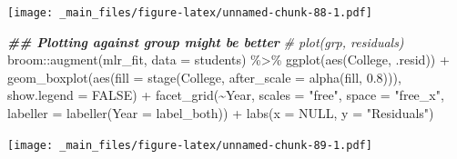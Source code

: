 \documentclass[
]{book}
\newenvironment{Shaded}{\begin{snugshade}}{\end{snugshade}}
\newcommand{\AttributeTok}[1]{\textcolor[rgb]{0.77,0.63,0.00}{#1}}
\newcommand{\CommentTok}[1]{\textcolor[rgb]{0.56,0.35,0.01}{\textit{#1}}}
\newcommand{\ConstantTok}[1]{\textcolor[rgb]{0.00,0.00,0.00}{#1}}
\newcommand{\DocumentationTok}[1]{\textcolor[rgb]{0.56,0.35,0.01}{\textbf{\textit{#1}}}}
\newcommand{\FloatTok}[1]{\textcolor[rgb]{0.00,0.00,0.81}{#1}}
\newcommand{\FunctionTok}[1]{\textcolor[rgb]{0.00,0.00,0.00}{#1}}
\newcommand{\NormalTok}[1]{#1}
\newcommand{\SpecialCharTok}[1]{\textcolor[rgb]{0.00,0.00,0.00}{#1}}
\newcommand{\StringTok}[1]{\textcolor[rgb]{0.31,0.60,0.02}{#1}}
\begin{document}
\texttt{[image: \_main\_files/figure-latex/unnamed-chunk-88-1.pdf]}

\begin{Shaded}
\begin{Highlighting}[]
\DocumentationTok{\#\# Plotting against group might be better}
\CommentTok{\# plot(grp, residuals)}
\NormalTok{broom}\SpecialCharTok{::}\FunctionTok{augment}\NormalTok{(mlr\_fit, }\AttributeTok{data =}\NormalTok{ students) }\SpecialCharTok{\%\textgreater{}\%} 
  \FunctionTok{ggplot}\NormalTok{(}\FunctionTok{aes}\NormalTok{(College, .resid)) }\SpecialCharTok{+}
  \FunctionTok{geom\_boxplot}\NormalTok{(}\FunctionTok{aes}\NormalTok{(}\AttributeTok{fill =} \FunctionTok{stage}\NormalTok{(College, }\AttributeTok{after\_scale =} \FunctionTok{alpha}\NormalTok{(fill, }\FloatTok{0.8}\NormalTok{))), }\AttributeTok{show.legend =} \ConstantTok{FALSE}\NormalTok{) }\SpecialCharTok{+}
  \FunctionTok{facet\_grid}\NormalTok{(}\SpecialCharTok{\textasciitilde{}}\NormalTok{Year, }\AttributeTok{scales =} \StringTok{"free"}\NormalTok{, }\AttributeTok{space =} \StringTok{"free\_x"}\NormalTok{, }\AttributeTok{labeller =} \FunctionTok{labeller}\NormalTok{(}\AttributeTok{Year =}\NormalTok{ label\_both)) }\SpecialCharTok{+}
  \FunctionTok{labs}\NormalTok{(}\AttributeTok{x =} \ConstantTok{NULL}\NormalTok{, }\AttributeTok{y =} \StringTok{"Residuals"}\NormalTok{)}
\end{Highlighting}
\end{Shaded}

\texttt{[image: \_main\_files/figure-latex/unnamed-chunk-89-1.pdf]}
\end{document}
